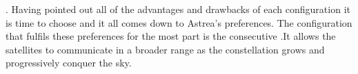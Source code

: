 \newline\newline.
Having pointed out all of the advantages and drawbacks of each configuration it is time to choose and it all comes down to Astrea's preferences. The configuration that fulfils these preferences for the most part is the consecutive .It allows the satellites to communicate in a broader range as the constellation grows and progressively conquer the sky.





